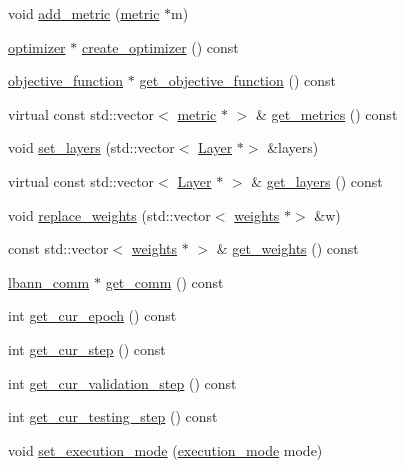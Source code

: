 \begin{DoxyCompactItemize}
void \hyperlink{classlbann_1_1model_a2ad536c9aeb5a1dfaa5a96107d62c4a4}{add\+\_\+metric} (\hyperlink{classlbann_1_1metric}{metric} $\ast$m)
\item 
\hyperlink{classlbann_1_1optimizer}{optimizer} $\ast$ \hyperlink{classlbann_1_1model_a0d2d5a1eac592e5721a81a9b9ea4b7f2}{create\+\_\+optimizer} () const
\item 
\hyperlink{classlbann_1_1objective__function}{objective\+\_\+function} $\ast$ \hyperlink{classlbann_1_1model_aee5530467523924a662dec891b9a7993}{get\+\_\+objective\+\_\+function} () const
\item 
virtual const std\+::vector$<$ \hyperlink{classlbann_1_1metric}{metric} $\ast$ $>$ \& \hyperlink{classlbann_1_1model_a84c738fd219b8c2936e76a9360f68936}{get\+\_\+metrics} () const
\item 
void \hyperlink{classlbann_1_1model_a95fb74f678f69b763d51b2ce987c8fde}{set\+\_\+layers} (std\+::vector$<$ \hyperlink{classlbann_1_1Layer}{Layer} $\ast$$>$ \&layers)
\item 
virtual const std\+::vector$<$ \hyperlink{classlbann_1_1Layer}{Layer} $\ast$ $>$ \& \hyperlink{classlbann_1_1model_ae14f4b2cc8882b3739d4aeb25d9e73c9}{get\+\_\+layers} () const
\item 
void \hyperlink{classlbann_1_1model_aaed20219476dc1458bbd058be36de1ec}{replace\+\_\+weights} (std\+::vector$<$ \hyperlink{classlbann_1_1weights}{weights} $\ast$$>$ \&w)
\item 
const std\+::vector$<$ \hyperlink{classlbann_1_1weights}{weights} $\ast$ $>$ \& \hyperlink{classlbann_1_1model_ac0a89794f1f51e7c502fff2745c973e6}{get\+\_\+weights} () const
\item 
\hyperlink{classlbann_1_1lbann__comm}{lbann\+\_\+comm} $\ast$ \hyperlink{classlbann_1_1model_a9e1cfe449d2f4858a32994f6be0042fb}{get\+\_\+comm} () const
\item 
int \hyperlink{classlbann_1_1model_a1cf70e098524cc5013bce56edd96dfe7}{get\+\_\+cur\+\_\+epoch} () const
\item 
int \hyperlink{classlbann_1_1model_ad0cdcba177434b52dc9c4a97be183a92}{get\+\_\+cur\+\_\+step} () const
\item 
int \hyperlink{classlbann_1_1model_a680ef8ecf644dbc821b5e7488d3bd2c4}{get\+\_\+cur\+\_\+validation\+\_\+step} () const
\item 
int \hyperlink{classlbann_1_1model_a4040b1f06a2a5d5187a72c06060124c1}{get\+\_\+cur\+\_\+testing\+\_\+step} () const
\item 
void \hyperlink{classlbann_1_1model_a375372b5b864ffbc4eaa0963f6939f65}{set\+\_\+execution\+\_\+mode} (\hyperlink{base_8hpp_a2781a159088df64ed7d47cc91c4dc0a8}{execution\+\_\+mode} mode)

\end{DoxyCompactItemize}
